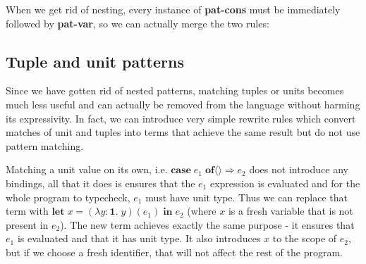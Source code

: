 When we get rid of nesting, every instance of \textbf{pat-cons} must be immediately followed by \textbf{pat-var}, so we can actually merge the two rules:

\begin{prooftree}
\end{prooftree}

\subsection{Tuple and unit patterns}

Since we have gotten rid of nested patterns, matching tuples or units becomes much less useful and can actually be removed from the language without harming its expressivity. In fact, we can introduce very simple rewrite rules which convert matches of unit and tuples into terms that achieve the same result but do not use pattern matching.

Matching a unit value on its own, i.e. $\mathbf{case} \; e_1 \; \mathbf{of} \langle\rangle \Rightarrow e_2$ does not introduce any bindings, all that it does is ensures that the $e_1$ expression is evaluated and for the whole program to typecheck, $e_1$ must have unit type. Thus we can replace that term with $\mathbf{let}\; x = (\lambda y: \mathbf{1}. \; y) (e_1) \; \mathbf{in} \; e_2$ (where $x$ is a fresh variable that is not present in $e_2$). The new term achieves exactly the same purpose - it ensures that $e_1$ is evaluated and that it has unit type. It also introduces $x$ to the scope of $e_2$, but if we choose a fresh identifier, that will not affect the rest of the program.

